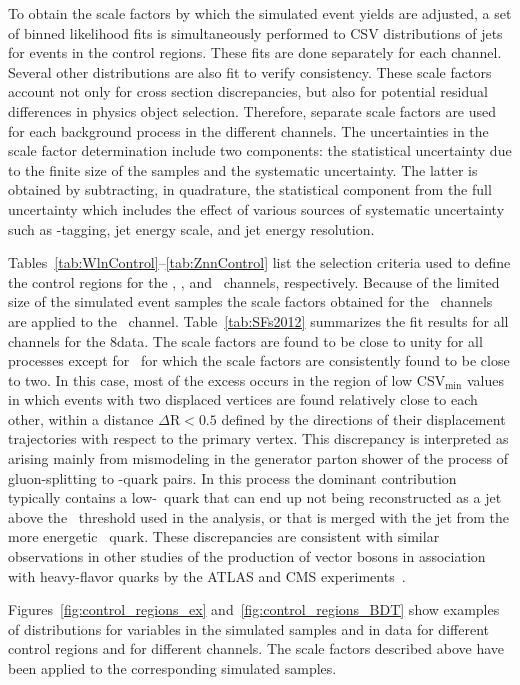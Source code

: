 \documentclass[11pt,twoside,a4paper,cmspaper,final,collab]{cms-tdr}
\begin{document}
To obtain the scale factors by which the simulated event
yields are adjusted, a set of binned likelihood fits is simultaneously performed to CSV distributions of
jets for events in the control regions. These fits are done separately
for each channel. Several other distributions are also fit to
verify consistency. These scale factors
account not only for cross section discrepancies, but also for potential residual
differences in physics object selection.
Therefore, separate scale factors are used for each background
process in the different channels. The uncertainties in the scale factor determination include two components: the statistical uncertainty due to the finite size of the samples and the systematic uncertainty.
The latter is obtained by subtracting, in quadrature, the statistical component from the full uncertainty which includes the effect of various sources of systematic uncertainty such as \cPqb-tagging, jet energy scale, and jet energy resolution.

Tables~\ref{tab:WlnControl}--\ref{tab:ZnnControl} list the selection criteria
used to define the control regions for the \WlnH, \ZllH, and \ZnnH\ channels,
respectively.  Because of the limited size of the simulated event
samples the scale factors obtained for the \WlnH\ channels are applied to the \WtnH\ channel.
Table~\ref{tab:SFs2012} summarizes the fit results
for all channels for the 8\TeV data. The scale factors are found to be
close to unity for all processes except for \Voneb\, for which the scale factors are consistently
found to be close to two. In this case, most of the excess occurs in
the region of low CSV$_{\text{min}}$ values in which events with two displaced vertices are found relatively close to each
other, within a distance $\Delta{\mathrm R}<0.5$ defined by the
directions of their displacement trajectories with respect to the
primary vertex. This discrepancy
is interpreted as arising mainly from mismodeling in the generator
parton shower of the process of gluon-splitting to \cPqb-quark pairs. In this
process the dominant contribution typically contains a low-\pt \cPqb\ quark that can end up not being reconstructed
as a jet above the \pt\ threshold used in the analysis, or that is merged with the jet from the more energetic \cPqb\ quark. These
discrepancies are consistent with similar observations in other
studies of the production of vector
bosons in association with heavy-flavor quarks by the
ATLAS and CMS experiments~\cite{Aad:2013vka,Chatrchyan:2013zja,Chatrchyan:2012vr}.

Figures~\ref{fig:control_regions_ex} and~\ref{fig:control_regions_BDT} show examples of distributions for variables in the simulated
      samples and in data for different
      control regions and for different channels. The scale factors
      described above have been applied to the corresponding simulated samples.
\end{document}
